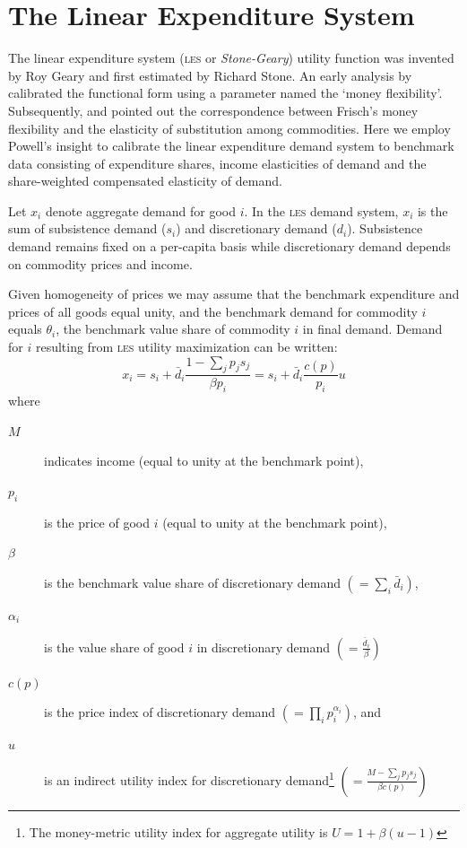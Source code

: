 \section[C]{The Linear Expenditure System}\label{LES}

\setlength{\parskip}{0.2in}

The linear expenditure system (\textsc{les} or \textit{Stone-Geary})
utility function was invented by Roy Geary and first estimated by
Richard Stone.  An early analysis by \cite{frisch} calibrated the
functional form using a parameter named the `money flexibility'.
Subsequently, \cite{sato} and \cite{powell} pointed out the
correspondence between Frisch's money flexibility and the elasticity
of substitution among commodities.  Here we employ Powell's insight to
calibrate the linear expenditure demand system to benchmark data
consisting of expenditure shares, income elasticities of demand and
the share-weighted compensated elasticity of demand.

Let $x_i$ denote aggregate demand for good $i$.  In the \textsc{les}
demand system, $x_i$ is the sum of subsistence demand ($s_i$) and
discretionary demand ($d_i$).  Subsistence demand remains fixed on a
per-capita basis while discretionary demand depends on commodity
prices and income.

Given homogeneity of prices we may assume that the benchmark
expenditure and prices of all goods equal unity, and the benchmark
demand for commodity $i$ equals $\theta_i$, the benchmark
value share of commodity $i$ in final demand.  Demand for $i$
resulting from \textsc{les} utility maximization can be written:
\begin{equation}
\label{lesdemand}
x_i  =  s_i + \bar d_i \frac{1 - \sum_j p_j s_j}{\beta p_i}
= s_i + \bar d_i \frac{c(p)}{p_i} u
\end{equation}
where \begin{description}
\item[$M$] indicates income (equal to unity at the benchmark point),
\item[$p_i$] is the price of good $i$ (equal to unity at the benchmark
point),
\item[$\beta$] is the benchmark value share of
discretionary demand $\left( = \sum_i \bar d_i \right)$,
\item[$\alpha_i$] is the value share of
good $i$ in discretionary demand $\left( = \frac{\bar d_i}{\beta}
\right)$
\item[$c(p)$] is the price index of discretionary demand $\left(= \prod_i
p^{\alpha_i}_i \right)$, and
\item[$u$] is an indirect
utility index for discretionary demand\footnote{The money-metric
utility index for aggregate utility is $U = 1 + \beta (u - 1)$}
$\left( = \frac{M - \sum_j p_j s_j}{\beta c(p)} \right)$
\end{description}

